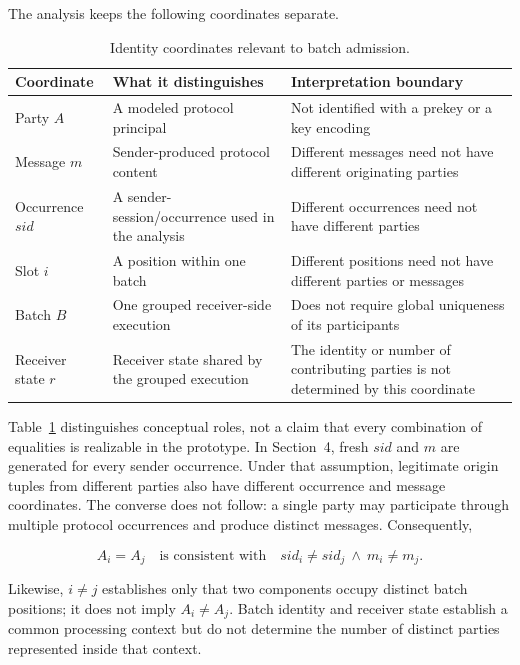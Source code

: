 The analysis keeps the following coordinates separate.

\begin{table}[htbp]
  \centering
  \caption{Identity coordinates relevant to batch admission.}
  \label{tab:identity-coordinates}
  \small
  \begin{tabularx}{\linewidth}{@{}lXX@{}}
    \toprule
    Coordinate & What it distinguishes & Interpretation boundary \\
    \midrule
    Party $A$ & A modeled protocol principal & Not identified with a prekey
      or a key encoding \\
    Message $m$ & Sender-produced protocol content & Different messages need not
      have different originating parties \\
    Occurrence $\mathit{sid}$ & A sender-session/occurrence used in the analysis
      & Different occurrences need not have different parties \\
    Slot $i$ & A position within one batch & Different positions need not have
      different parties or messages \\
    Batch $B$ & One grouped receiver-side execution & Does not require global
      uniqueness of its participants \\
    Receiver state $r$ & Receiver state shared by the grouped execution & The
      identity or number of contributing parties is not determined by this coordinate \\
    \bottomrule
  \end{tabularx}
\end{table}

Table~\ref{tab:identity-coordinates} distinguishes conceptual roles, not a
claim that every combination of equalities is realizable in the prototype.
In Section~4, fresh $\mathit{sid}$ and $m$ are generated for every sender
occurrence. Under that assumption, legitimate origin tuples from different
parties also have different occurrence and message coordinates. The converse
does not follow: a single party may
participate through multiple protocol occurrences and produce distinct
messages. Consequently,

\begin{equation}
  A_i=A_j
  \quad\text{is consistent with}\quad
  \mathit{sid}_i\neq\mathit{sid}_j
  \ \land\ 
  m_i\neq m_j.
  \label{eq:same-party-different-message}
\end{equation}

Likewise, $i\neq j$ establishes only that two components occupy distinct batch
positions; it does not imply $A_i\neq A_j$. Batch identity and receiver state
establish a common processing context but do not determine the number of
distinct parties represented inside that context.

